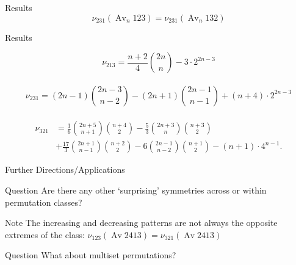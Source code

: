 \documentclass[xcolor=table,dvipsnames]{beamer}
\DeclareMathOperator{\Av}{Av}
\newcommand{\num}{\nu}
\begin{document}
  \begin{frame}{Results}
    \pause
      $$ \num_{231}(\Av_n 123) = \num_{231}(\Av_n 132)$$
  \end{frame}

  \begin{frame}{Results}

    $$ \nu_{213} = \frac{n+2}{4} \binom{2n}{n} - 3 \cdot 2^{2n-3} $$\\[.5pc]
    $$ \nu_{231} = (2n-1) \binom{2n-3}{n-2} - (2n+1)\binom{2n-1}{n-1} + 
       (n+4) \cdot 2^{2n-3}$$\\[.5pc]
    $$ \begin{aligned} \nu_{321} 
        &= \frac{1}{6} \binom{2n+5}{n+1} \binom{n+4}{2} 
        - \frac{5}{3} \binom{2n+3}{n} \binom{n+3}{2} \\
        &+ \frac{17}{3} \binom{2n+1}{n-1} \binom{n+2}{2} 
        - 6\binom{2n-1}{n-2} \binom{n+1}{2} - (n+1) \cdot 4^{n-1}.
      \end{aligned}
    $$

  \end{frame}




  \begin{frame}{Further Directions/Applications}
    \pause
    \begin{block}{Question}
      Are there any other `surprising' symmetries across or within permutation
      classes?
    \end{block}

    \pause

    \begin{block}{Note}
      The increasing and decreasing patterns are not always the opposite extremes of the
      class: $\num_{123} (\Av 2413) = \num_{321} (\Av 2413) $ 
    \end{block}
    \pause

    \vspace{1pc}

    \begin{center}
    \end{center}

    \pause
    \begin{block}{Question}
      What about multiset permutations?
    \end{block}

  \end{frame}
\end{document}
